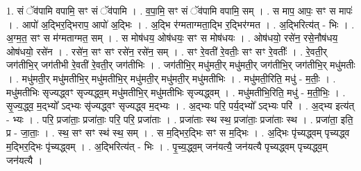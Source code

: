 \documentclass[17pt]{extarticle}
\begin{document}
1. सं ॅव॑पामि वपामि॒ सꣳ सं ॅव॑पामि । . व॒पा॒मि॒ सꣳ सं ॅव॑पामि वपामि॒ सम् । . स माप॒ आपः॒ सꣳ स मापः॑ । . आपो॑ अ॒द्भिर॒द्भिराप॒ आपो॑ अ॒द्भिः । . अ॒द्भि र॑ग्मताग्मता॒द्भि र॒द्भिर॑ग्मत । . अ॒द्भिरित्य॑त् - भिः । . अ॒ग्म॒त॒ सꣳ स म॑ग्मताग्मत॒ सम् । . स मोष॑धय॒ ओष॑धयः॒ सꣳ स मोष॑धयः । . ओष॑धयो॒ रसे॑न॒ रसे॒नौष॑धय॒ ओष॑धयो॒ रसे॑न । . रसे॑न॒ सꣳ सꣳ रसे॑न॒ रसे॑न॒ सम् । . सꣳ रे॒वती॑ रे॒वतीः॒ सꣳ सꣳ रे॒वतीः᳚ । . रे॒वती॒र् जग॑तीभि॒र् जग॑तीभी रे॒वती॑ रे॒वती॒र् जग॑तीभिः । . जग॑तीभि॒र् मधु॑मती॒र् मधु॑मती॒र् जग॑तीभि॒र् जग॑तीभि॒र् मधु॑मतीः । . मधु॑मती॒र् मधु॑मतीभि॒र् मधु॑मतीभि॒र् मधु॑मती॒र् मधु॑मती॒र् मधु॑मतीभिः । . मधु॑मती॒रिति॒ मधु॑ - म॒तीः॒ । . मधु॑मतीभिः सृज्यद्ध्वꣳ सृज्यद्ध्व॒म् मधु॑मतीभि॒र् मधु॑मतीभिः सृज्यद्ध्वम् । . मधु॑मतीभि॒रिति॒ मधु॑ - म॒ती॒भिः॒ । . सृ॒ज्य॒द्ध्व॒ म॒द्भ्यो᳚ ऽद्भ्यः सृ॑ज्यद्ध्वꣳ सृज्यद्ध्व म॒द्भ्यः । . अ॒द्भ्यः परि॒ पर्य॒द्भ्यो᳚ ऽद्भ्यः परि॑ । . अ॒द्भ्य इत्य॑त् - भ्यः । . परि॒ प्रजा॑ताः॒ प्रजा॑ताः॒ परि॒ परि॒ प्रजा॑ताः । . प्रजा॑ताः स्थ स्थ॒ प्रजा॑ताः॒ प्रजा॑ताः स्थ । . प्रजा॑ता॒ इति॒ प्र - जा॒ताः॒ । . स्थ॒ सꣳ सꣳ स्थ॑ स्थ॒ सम् । . स म॒द्भिर॒द्भिः सꣳ स म॒द्भिः । . अ॒द्भिः पृ॑च्यद्ध्वम् पृच्यद्ध्व म॒द्भिर॒द्भिः पृ॑च्यद्ध्वम् । . अ॒द्भिरित्य॑त् - भिः । . पृ॒च्य॒द्ध्व॒म् जन॑यत्यै॒ जन॑यत्यै पृच्यद्ध्वम् पृच्यद्ध्व॒म् जन॑यत्यै । \newline
\end{document}
